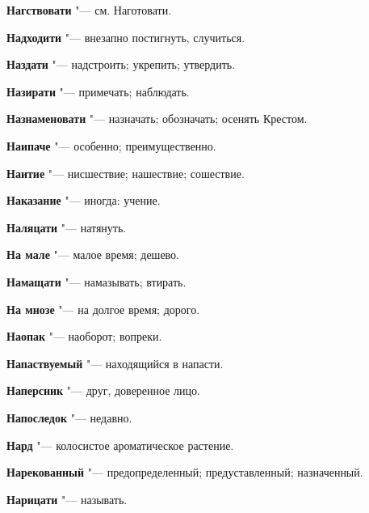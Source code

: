 \begin{mymulticols}{2}
\noindent\textbf{Нагствовати} "--- см. Наготовати. 




\noindent\textbf{Надходити} "--- внезапно постигнуть, случиться. 




\noindent\textbf{Наздати} "--- надстроить; укрепить; утвердить. 




\noindent\textbf{Назирати} "--- примечать; наблюдать. 




\noindent\textbf{Назнаменовати} "--- назначать; обозначать; осенять Крестом. 




\noindent\textbf{Наипаче} "--- особенно; преимущественно. 




\noindent\textbf{Наитие} "--- нисшествие; нашествие; сошествие. 




\noindent\textbf{Наказание} "--- иногда: учение. 




\noindent\textbf{Наляцати} "--- натянуть. 




\noindent\textbf{На мале} "--- малое время; дешево. 




\noindent\textbf{Намащати} "--- намазывать; втирать. 




\noindent\textbf{На мнозе} "--- на долгое время; дорого. 




\noindent\textbf{Наопак} "--- наоборот; вопреки. 




\noindent\textbf{Напаствуемый} "--- находящийся в напасти. 




\noindent\textbf{Наперсник} "--- друг, доверенное лицо. 




\noindent\textbf{Напоследок} "--- недавно. 




\noindent\textbf{Нард} "--- колосистое ароматическое растение. 




\noindent\textbf{Нарекованный} "--- предопределенный; предуставленный; назначенный. 




\noindent\textbf{Нарицати} "--- называть. 





\end{mymulticols}
